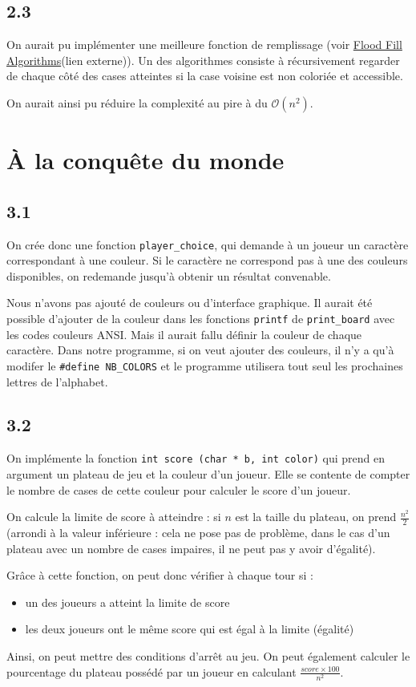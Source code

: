 \documentclass[12pt]{article}
\def\question#1{\subsection*{#1}}
\def\sec#1{\section{#1}}
\begin{document}
\question{2.3}

On aurait pu implémenter une meilleure fonction de remplissage (voir \href{https://en.wikipedia.org/wiki/Flood_fill}{Flood Fill Algorithms}(lien externe)). Un des algorithmes consiste à récursivement regarder de chaque côté des cases atteintes si la case voisine est non coloriée et accessible.

On aurait ainsi pu réduire la complexité au pire à du $\mathcal{O}(n^2)$.


\sec{À la conquête du monde}
\question{3.1}
On crée donc une fonction \texttt{player\_choice}, qui demande à un joueur un caractère correspondant à une couleur. Si le caractère ne correspond pas à une des couleurs disponibles, on redemande jusqu'à obtenir un résultat convenable.

Nous n'avons pas ajouté de couleurs ou d'interface graphique. Il aurait été possible d'ajouter de la couleur dans les fonctions \texttt{printf} de \texttt{print\_board} avec les codes couleurs ANSI. Mais il aurait fallu définir la couleur de chaque caractère. Dans notre programme, si on veut ajouter des couleurs, il n'y a qu'à modifer le \texttt{\#define NB\_COLORS} et le programme utilisera tout seul les prochaines lettres de l'alphabet.


\question{3.2}
On implémente la fonction \texttt{int score (char * b, int color)} qui prend en argument un plateau de jeu et la couleur d'un joueur. Elle se contente de compter le nombre de cases de cette couleur pour calculer le score d'un joueur.

On calcule la limite de score à atteindre : si $n$ est la taille du plateau, on prend $\frac{n^2}{2}$ (arrondi à la valeur inférieure : cela ne pose pas de problème, dans le cas d'un plateau avec un nombre de cases impaires, il ne peut pas y avoir d'égalité).

Grâce à cette fonction, on peut donc vérifier à chaque tour si :
\begin{itemize}
\item un des joueurs a atteint la limite de score
\item les deux joueurs ont le même score qui est égal à la limite (égalité)
\end{itemize}

Ainsi, on peut mettre des conditions d'arrêt au jeu.
On peut également calculer le pourcentage du plateau possédé par un joueur en calculant $\frac{score \times 100}{n^2}$.
\end{document}

